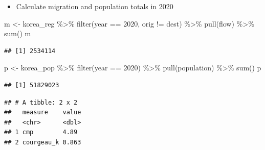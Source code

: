 \documentclass[
]{book}
\newenvironment{Shaded}{\begin{snugshade}}{\end{snugshade}}
\newcommand{\AttributeTok}[1]{\textcolor[rgb]{0.77,0.63,0.00}{#1}}
\newcommand{\DecValTok}[1]{\textcolor[rgb]{0.00,0.00,0.81}{#1}}
\newcommand{\FunctionTok}[1]{\textcolor[rgb]{0.00,0.00,0.00}{#1}}
\newcommand{\NormalTok}[1]{#1}
\newcommand{\OtherTok}[1]{\textcolor[rgb]{0.56,0.35,0.01}{#1}}
\newcommand{\SpecialCharTok}[1]{\textcolor[rgb]{0.00,0.00,0.00}{#1}}
\providecommand{\tightlist}{%
  \setlength{\itemsep}{0pt}\setlength{\parskip}{0pt}}
\begin{document}
\begin{itemize}
\tightlist
\item
  Calculate migration and population totals in 2020
\end{itemize}

\begin{Shaded}
\begin{Highlighting}[]
\NormalTok{m }\OtherTok{\textless{}{-}}\NormalTok{ korea\_reg }\SpecialCharTok{\%\textgreater{}\%}
  \FunctionTok{filter}\NormalTok{(year }\SpecialCharTok{==} \DecValTok{2020}\NormalTok{,}
\NormalTok{         orig }\SpecialCharTok{!=}\NormalTok{ dest) }\SpecialCharTok{\%\textgreater{}\%}
  \FunctionTok{pull}\NormalTok{(flow) }\SpecialCharTok{\%\textgreater{}\%}
  \FunctionTok{sum}\NormalTok{()}
\NormalTok{m}
\end{Highlighting}
\end{Shaded}

\begin{verbatim}
## [1] 2534114
\end{verbatim}

\begin{Shaded}
\begin{Highlighting}[]
\NormalTok{p }\OtherTok{\textless{}{-}}\NormalTok{ korea\_pop }\SpecialCharTok{\%\textgreater{}\%}
  \FunctionTok{filter}\NormalTok{(year }\SpecialCharTok{==} \DecValTok{2020}\NormalTok{) }\SpecialCharTok{\%\textgreater{}\%}
  \FunctionTok{pull}\NormalTok{(population) }\SpecialCharTok{\%\textgreater{}\%}
  \FunctionTok{sum}\NormalTok{()}
\NormalTok{p}
\end{Highlighting}
\end{Shaded}

\begin{verbatim}
## [1] 51829023
\end{verbatim}

\begin{Shaded}
\end{Shaded}

\begin{verbatim}
## # A tibble: 2 x 2
##   measure    value
##   <chr>      <dbl>
## 1 cmp        4.89 
## 2 courgeau_k 0.863
\end{verbatim}
\end{document}
